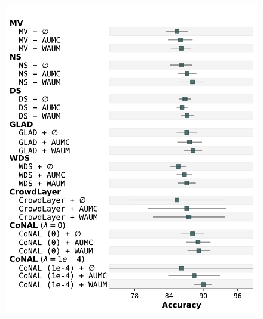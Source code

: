 \begin{figure}[th]
    \centering
    \begin{minipage}{0.45\textwidth}
        \centering
        \includegraphics[width=\linewidth]{images/Accuracy_foresplot_labelme.pdf}
        \label{fig:forest_labelme_accuracy}
    \end{minipage}
    \hfill
    \begin{minipage}{0.45\textwidth}
        \centering

\end{minipage}
\end{figure}
